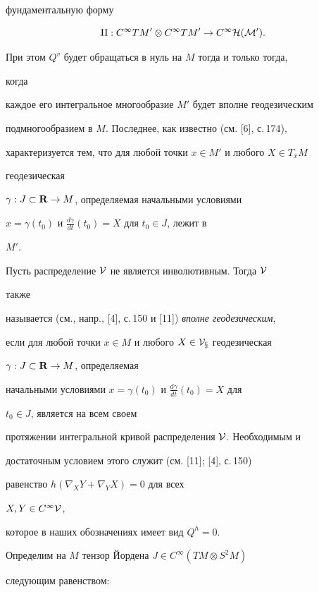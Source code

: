 фундаментальную форму 


$$ 


\mathrm{II}:C^\infty TM'\otimes C^\infty TM'\to 


C^\infty\cal H(M'). 


$$ 


При этом $Q^v$ будет обращаться в нуль на $M$ тогда и только тогда, 


когда 


каждое его интегральное многообразие $M'$ будет вполне геодезическим 


подмногообразием в $M$. Последнее, как известно (см. [6], с.\,174), 


характеризуется тем, что для любой точки $x\in M'$ и любого $X\in T_x M$ 


геодезическая 


$\gamma:J\subset\bold R\to M$, определяемая начальными условиями 


$x=\gamma(t_0)$ и $\frac{d\gamma}{dt}(t_0)=X$ для $t_0\in J$, лежит в 


$M'$. 


 


Пусть распределение $\cal V$ не является инволютивным. Тогда $\cal V$ 


также 


называется (см., напр., [4], с.\,150 и [11]) {\it вполне геодезическим}, 


если для любой точки $x\in M$ и любого $X\in\cal V_x$ геодезическая 


$\gamma:J\subset\bold R\to M$, определяемая 


начальными условиями $x=\gamma(t_0)$ и $\frac{d\gamma}{dt}(t_0)=X$ для 


$t_0\in J$, является на всем своем 


протяжении интегральной кривой распределения $\cal V$. Необходимым и 


достаточным условием этого служит (см. [11]; [4], с.\,150) 


равенство $h(\nabla_X Y+\nabla_Y X)=0$ для всех 


$X,Y\in C^\infty\cal V$, 


которое в наших обозначениях имеет вид $Q^h=0$. 


 


Определим на $M$ тензор Йордена $J\in C^\infty(TM\otimes S^2M)$ 


следующим равенством: 


